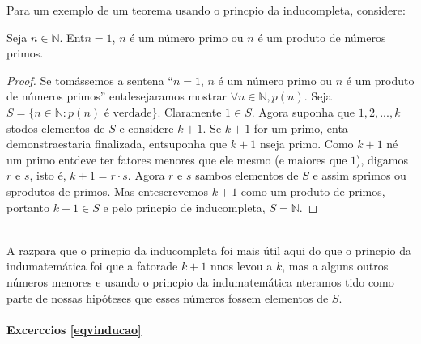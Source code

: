 Para um exemplo de um teorema usando o princ\ih pio da indu\cao completa, considere:  
\begin{teob}\label{indteo6}
Seja $n\in\mathbb{N}$. Ent\ao $n=1$, $n$ \'e um n\'umero primo ou $n$ \'e um produto de n\'umeros primos.
\end{teob}
\begin{proof}
Se tom\'assemos a senten\cc a ``$n=1$, $n$ \'e um n\'umero primo ou $n$ \'e um produto de n\'umeros primos'' ent\ao desejar\ih amos mostrar $\forall n\in\mathbb{N}, p(n)$. Seja $S=\{n\in\mathbb{N}: p(n) \textrm{ \'e verdade}\}$. Claramente $1\in S$. Agora suponha que $1,2,...,k$ s\ao todos elementos de $S$ e considere $k+1$. Se $k+1$ for um primo, ent\ao a demonstra\cao estaria finalizada, ent\ao suponha que $k+1$ n\ao seja primo. Como $k+1$ n\ao \'e um primo ent\ao deve ter fatores menores que ele mesmo (e maiores que $1$), digamos $r$ e $s$, isto \'e, $k+1=r\cdot s$. Agora $r$ e $s$ s\ao ambos elementos de $S$ e assim s\ao primos ou s\ao produtos de primos. Mas ent\ao escrevemos $k+1$ como um produto de primos, portanto $k+1\in S$ e pelo princ\ih pio de indu\cao completa, $S=\mathbb{N}$. 
\end{proof}
\\

A raz\ao para que o princ\ih pio da indu\cao completa foi mais \'util aqui do que o princ\ih pio da indu\cao matem\'atica foi que a fatora\cao de $k+1$ n\ao nos levou a $k$, mas a alguns outros n\'umeros menores e usando o princ\ih pio da indu\cao matem\'atica n\ao ter\ih amos tido como parte de nossas hip\'oteses que esses n\'umeros fossem elementos de $S$.

\paragraph{Excerc\ih cios \ref{eqvinducao}}

